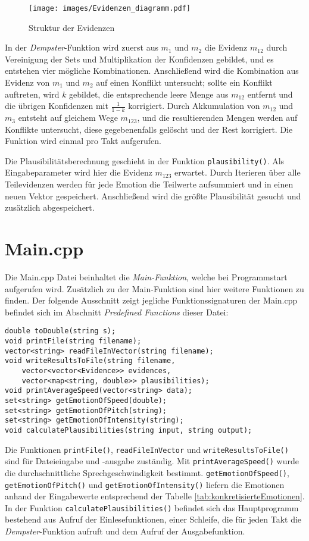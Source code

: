 \begin{figure}
\centering
\texttt{[image: images/Evidenzen\_diagramm.pdf]}
\caption{Struktur der Evidenzen}
\label{diagramm_evidenzen}
\end{figure}

In der \textit{Dempster}-Funktion wird zuerst aus \(m_1\) und \(m_2\) die Evidenz \(m_{12}\) durch Vereinigung der Sets und Multiplikation der Konfidenzen gebildet, und es entstehen vier mögliche Kombinationen. Anschließend wird die Kombination aus Evidenz von \(m_1\) und \(m_2\) auf einen Konflikt untersucht; sollte ein Konflikt auftreten, wird \(k\) gebildet, die entsprechende leere Menge aus \(m_{12}\) entfernt und die übrigen Konfidenzen mit \(\frac{1}{1-k}\) korrigiert. Durch Akkumulation von \(m_{12}\) und \(m_3\) entsteht auf gleichem Wege \(m_{123}\), und die resultierenden Mengen werden auf Konflikte untersucht, diese gegebenenfalls gelöscht und der Rest korrigiert. Die Funktion wird einmal pro Takt aufgerufen.
 
Die Plausibilitätsberechnung geschieht in der Funktion \verb|plausibility()|. Als Eingabeparameter wird hier die Evidenz \(m_{123}\) erwartet. Durch Iterieren über alle Teilevidenzen werden für jede Emotion die Teilwerte aufsummiert und in einen neuen Vektor gespeichert. Anschließend wird die größte Plausibilität gesucht und zusätzlich abgespeichert.
 
\section{Main.cpp}
Die Main.cpp Datei beinhaltet die \textit{Main-Funktion}, welche bei Programmstart aufgerufen wird.
Zusätzlich zu der Main-Funktion sind hier weitere Funktionen zu finden. Der folgende Ausschnitt zeigt jegliche Funktionssignaturen der Main.cpp befindet sich im Abschnitt \textit{Predefined Functions} dieser Datei: 

\begin{lstlisting}[caption=Predefined classes/functions aus der Main.cpp, label=Bsp.1]
double toDouble(string s);
void printFile(string filename);
vector<string> readFileInVector(string filename);
void writeResultsToFile(string filename, 
	vector<vector<Evidence>> evidences, 
	vector<map<string, double>> plausibilities);
void printAverageSpeed(vector<string> data);
set<string> getEmotionOfSpeed(double);
set<string> getEmotionOfPitch(string);
set<string> getEmotionOfIntensity(string);
void calculatePlausibilities(string input, string output);
\end{lstlisting}
Die Funktionen \verb|printFile()|, \verb|readFileInVector| und \verb|writeResultsToFile()| sind  für Dateieingabe und -ausgabe zuständig. Mit \verb|printAverageSpeed()| wurde die durchschnittliche Sprechgeschwindigkeit bestimmt. \verb|getEmotionOfSpeed()|, \verb|getEmotionOfPitch()| und \verb|getEmotionOfIntensity()| liefern die Emotionen anhand der Eingabewerte entsprechend der Tabelle \ref{tab:konkretisierteEmotionen}. In der Funktion \verb|calculatePlausibilities()| befindet sich das Hauptprogramm bestehend aus Aufruf der Einlesefunktionen, einer Schleife, die für jeden Takt die \textit{Dempster}-Funktion aufruft und dem Aufruf der Ausgabefunktion.

